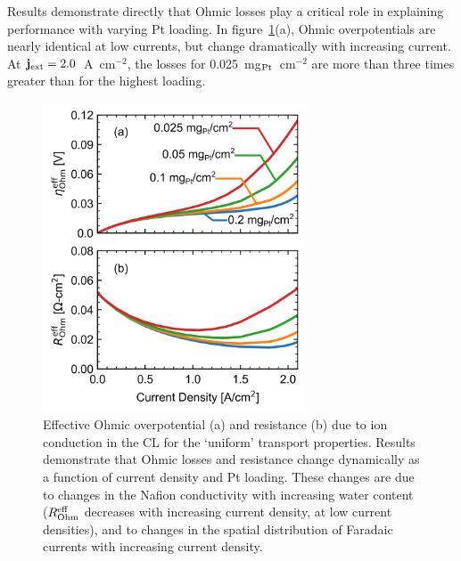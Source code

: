 \documentclass[final,3p,times,twocolumn]{elsarticle}    %
\newcommand{\crr}[1]{\color{red} #1 \color{black}}
\begin{document}
Results demonstrate directly that Ohmic losses play a critical role in explaining performance with varying Pt loading. In figure~\ref{fig:effective-Ohmic-measures}(a), Ohmic overpotentials are nearly identical at low currents, but change dramatically with increasing current. At ${\bf j}_{\rm ext} = 2.0$~A~cm$^{-2}$, the losses for 0.025~mg$_{\rm Pt}$~cm$^{-2}$ are more than three times greater than for the highest loading. 

\begin{figure}[!tb]
    \centering
    \includegraphics[width=3.07in]{figures_uniform/effective-ohmic-plots-3_07in.png}
    \crr{
    \caption{Effective Ohmic overpotential (a) and resistance (b) due to ion conduction in the CL for the `uniform' transport properties. Results demonstrate that Ohmic losses and resistance change dynamically as a function of current density and Pt loading. These changes are due to changes in the Nafion conductivity with increasing water content ($R_{\rm Ohm}^{\rm eff}$ decreases with increasing current density, at low current densities), and to changes in the spatial distribution of Faradaic currents with increasing current density.}}
    \label{fig:effective-Ohmic-measures}
\end{figure}
\end{document}

